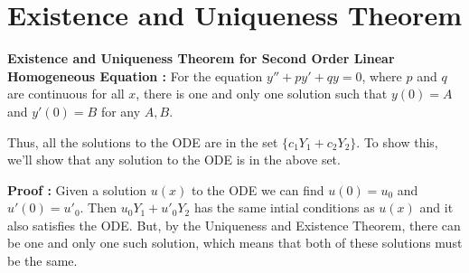 \section{Existence and Uniqueness Theorem}

\begin{mdframed}
\begin{center}
{\bf  Existence and Uniqueness Theorem for Second Order Linear Homogeneous Equation : }
For the equation $y'' + py' + qy = 0$, where $p$ and $q$ are continuous for all $x$, 
there is one and only one solution such that $y(0) = A$ and $y'(0) = B$ for any $A, B$.
\end{center}
\end{mdframed}


Thus, all the solutions to the ODE are in the set $\{ c_1 Y_1 + c_2 Y_2 \}$.
To show this, we'll show that any solution to the ODE is in the above set.

{\bf Proof : } Given a solution $u(x)$ to the ODE we can find $u(0) = u_0$ and $u'(0) = u'_0$.
Then $u_0 Y_1 + u'_0 Y_2$ has the same intial conditions as $u(x)$
and it also satisfies the ODE. But, by the Uniqueness and Existence Theorem, 
there can be one and only one such solution, which means that both of these solutions must be the same.
